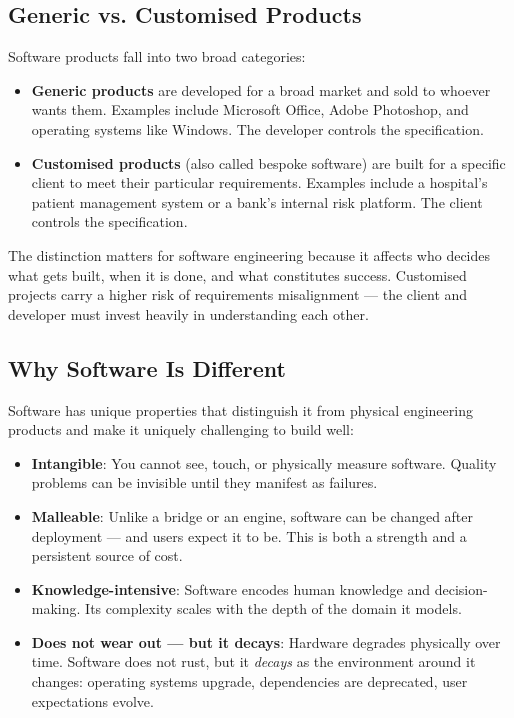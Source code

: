\documentclass[11pt,a4paper]{book}
\begin{document}
\subsection{Generic vs. Customised Products}

Software products fall into two broad categories:

\begin{itemize}
  \item \textbf{Generic products} are developed for a broad market and sold to whoever wants them. Examples include Microsoft Office, Adobe Photoshop, and operating systems like Windows. The developer controls the specification.
\end{itemize}

\begin{itemize}
  \item \textbf{Customised products} (also called bespoke software) are built for a specific client to meet their particular requirements. Examples include a hospital's patient management system or a bank's internal risk platform. The client controls the specification.
\end{itemize}

The distinction matters for software engineering because it affects who decides what gets built, when it is done, and what constitutes success. Customised projects carry a higher risk of requirements misalignment --- the client and developer must invest heavily in understanding each other.

\subsection{Why Software Is Different}

Software has unique properties that distinguish it from physical engineering products and make it uniquely challenging to build well:

\begin{itemize}
  \item \textbf{Intangible}: You cannot see, touch, or physically measure software. Quality problems can be invisible until they manifest as failures.
  \item \textbf{Malleable}: Unlike a bridge or an engine, software can be changed after deployment --- and users expect it to be. This is both a strength and a persistent source of cost.
  \item \textbf{Knowledge-intensive}: Software encodes human knowledge and decision-making. Its complexity scales with the depth of the domain it models.
  \item \textbf{Does not wear out --- but it decays}: Hardware degrades physically over time. Software does not rust, but it \textit{decays} as the environment around it changes: operating systems upgrade, dependencies are deprecated, user expectations evolve.
\end{itemize}
\end{document}
